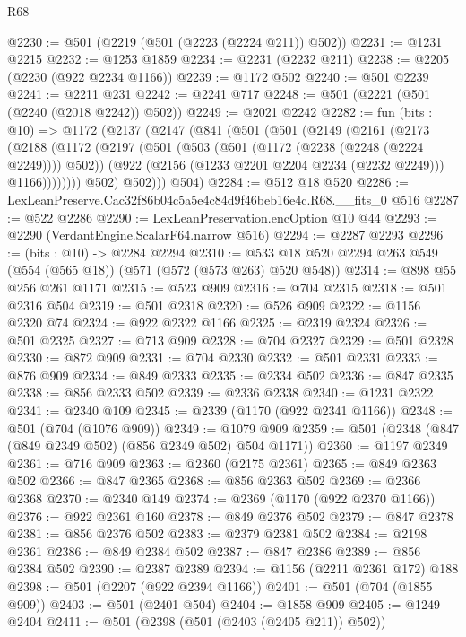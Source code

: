 \begin{lexlean}{R68}
\begin{coremodule}
@2230 := @501 (@2219 (@501 (@2223 (@2224 @211)) @502))
@2231 := @1231 @2215
@2232 := @1253 @1859
@2234 := @2231 (@2232 @211)
@2238 := @2205 (@2230 (@922 @2234 @1166))
@2239 := @1172 @502
@2240 := @501 @2239
@2241 := @2211 @231
@2242 := @2241 @717
@2248 := @501 (@2221 (@501 (@2240 (@2018 @2242)) @502))
@2249 := @2021 @2242
@2282 := fun (bits : @10) =>
  @1172
    (@2137
      (@2147
        (@841
          (@501
            (@501
              (@2149
                (@2161
                  (@2173
                    (@2188
                      (@1172
                        (@2197
                          (@501
                            (@503 (@501 (@1172 (@2238 (@2248 (@2224 @2249)))) @502))
                            (@922 (@2156 (@1233 @2201 @2204 @2234 (@2232 @2249))) @1166))))))))
              @502)
            @502)))
      @504)
@2284 := @512 @18 @520
@2286 := LexLeanPreserve.Cac32f86b04c5a5e4c84d9f46beb16e4c.R68.__fits_0 @516
@2287 := @522 @2286
@2290 := LexLeanPreservation.encOption @10 @44
@2293 := @2290 (VerdantEngine.ScalarF64.narrow @516)
@2294 := @2287 @2293
@2296 := (bits : @10) -> @2284 @2294
@2310 := @533 @18 @520 @2294 @263 @549 (@554 (@565 @18)) (@571 (@572 (@573 @263) @520 @548))
@2314 := @898 @55 @256 @261 @1171
@2315 := @523 @909
@2316 := @704 @2315
@2318 := @501 @2316 @504
@2319 := @501 @2318
@2320 := @526 @909
@2322 := @1156 @2320 @74
@2324 := @922 @2322 @1166
@2325 := @2319 @2324
@2326 := @501 @2325
@2327 := @713 @909
@2328 := @704 @2327
@2329 := @501 @2328
@2330 := @872 @909
@2331 := @704 @2330
@2332 := @501 @2331
@2333 := @876 @909
@2334 := @849 @2333
@2335 := @2334 @502
@2336 := @847 @2335
@2338 := @856 @2333 @502
@2339 := @2336 @2338
@2340 := @1231 @2322
@2341 := @2340 @109
@2345 := @2339 (@1170 (@922 @2341 @1166))
@2348 := @501 (@704 (@1076 @909))
@2349 := @1079 @909
@2359 := @501 (@2348 (@847 (@849 @2349 @502) (@856 @2349 @502) @504 @1171))
@2360 := @1197 @2349
@2361 := @716 @909
@2363 := @2360 (@2175 @2361)
@2365 := @849 @2363 @502
@2366 := @847 @2365
@2368 := @856 @2363 @502
@2369 := @2366 @2368
@2370 := @2340 @149
@2374 := @2369 (@1170 (@922 @2370 @1166))
@2376 := @922 @2361 @160
@2378 := @849 @2376 @502
@2379 := @847 @2378
@2381 := @856 @2376 @502
@2383 := @2379 @2381 @502
@2384 := @2198 @2361
@2386 := @849 @2384 @502
@2387 := @847 @2386
@2389 := @856 @2384 @502
@2390 := @2387 @2389
@2394 := @1156 (@2211 @2361 @172) @188
@2398 := @501 (@2207 (@922 @2394 @1166))
@2401 := @501 (@704 (@1855 @909))
@2403 := @501 (@2401 @504)
@2404 := @1858 @909
@2405 := @1249 @2404
@2411 := @501 (@2398 (@501 (@2403 (@2405 @211)) @502))

\end{coremodule}
\end{lexlean}
